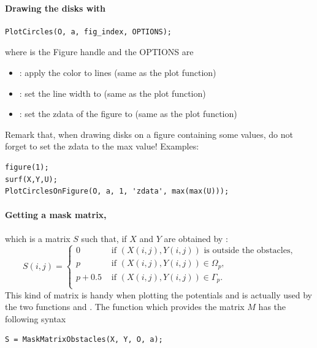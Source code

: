 \paragraph{Drawing the disks with }\mbox{}
\begin{lstlisting}
PlotCircles(O, a, fig_index, OPTIONS);
\end{lstlisting}
where  is the Figure handle and the OPTIONS are
\begin{itemize}
\item {}: apply the  color to lines (same as the plot function)
\item {}: set the line width to  (same as the plot function)
\item {}: set the zdata of the figure to  (same as the plot function)
\end{itemize}
Remark that, when drawing disks on a figure containing some values, do not forget to set the zdata to the max value! Examples: 
\begin{lstlisting}
figure(1);
surf(X,Y,U);
PlotCirclesOnFigure(O, a, 1, 'zdata', max(max(U)));
\end{lstlisting}

\paragraph{Getting a mask matrix,} which is a matrix $S$ such that, if $X$ and $Y$ are obtained by :
$$
S(i,j) = \begin{cases}
0 & \text{ if } (X(i,j),Y(i,j)) \text{ is outside the obstacles,}\\
p & \text{ if } (X(i,j),Y(i,j)) \in\Omega_p,\\
p+0.5 & \text{ if } (X(i,j),Y(i,j)) \in\Gamma_p.\\
\end{cases}
$$
This kind of matrix is handy when plotting the potentials and is actually used by the two functions  and . The function  which provides the matrix $M$ has the following syntax
\begin{lstlisting}
S = MaskMatrixObstacles(X, Y, O, a);
\end{lstlisting}


